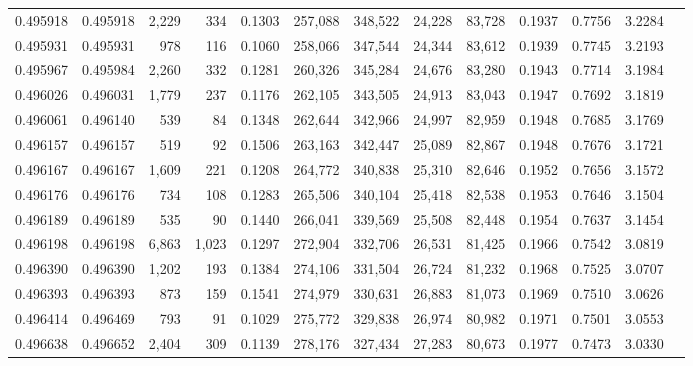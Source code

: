 \begin{tabular}{rrrrrrrrrrrrr}
0.495918 & 0.495918 & 2,229 &   334 &                                     0.1303 & 257,088 & 348,522 &  24,228 &  83,728 & 0.1937 & 0.7756 & 3.2284 \\
0.495931 & 0.495931 &   978 &   116 &                                     0.1060 & 258,066 & 347,544 &  24,344 &  83,612 & 0.1939 & 0.7745 & 3.2193 \\
0.495967 & 0.495984 & 2,260 &   332 &                                     0.1281 & 260,326 & 345,284 &  24,676 &  83,280 & 0.1943 & 0.7714 & 3.1984 \\
0.496026 & 0.496031 & 1,779 &   237 &                                     0.1176 & 262,105 & 343,505 &  24,913 &  83,043 & 0.1947 & 0.7692 & 3.1819 \\
0.496061 & 0.496140 &   539 &    84 &                                     0.1348 & 262,644 & 342,966 &  24,997 &  82,959 & 0.1948 & 0.7685 & 3.1769 \\
0.496157 & 0.496157 &   519 &    92 &                                     0.1506 & 263,163 & 342,447 &  25,089 &  82,867 & 0.1948 & 0.7676 & 3.1721 \\
0.496167 & 0.496167 & 1,609 &   221 &                                     0.1208 & 264,772 & 340,838 &  25,310 &  82,646 & 0.1952 & 0.7656 & 3.1572 \\
0.496176 & 0.496176 &   734 &   108 &                                     0.1283 & 265,506 & 340,104 &  25,418 &  82,538 & 0.1953 & 0.7646 & 3.1504 \\
0.496189 & 0.496189 &   535 &    90 &                                     0.1440 & 266,041 & 339,569 &  25,508 &  82,448 & 0.1954 & 0.7637 & 3.1454 \\
0.496198 & 0.496198 & 6,863 & 1,023 &                                     0.1297 & 272,904 & 332,706 &  26,531 &  81,425 & 0.1966 & 0.7542 & 3.0819 \\
0.496390 & 0.496390 & 1,202 &   193 &                                     0.1384 & 274,106 & 331,504 &  26,724 &  81,232 & 0.1968 & 0.7525 & 3.0707 \\
0.496393 & 0.496393 &   873 &   159 &                                     0.1541 & 274,979 & 330,631 &  26,883 &  81,073 & 0.1969 & 0.7510 & 3.0626 \\
0.496414 & 0.496469 &   793 &    91 &                                     0.1029 & 275,772 & 329,838 &  26,974 &  80,982 & 0.1971 & 0.7501 & 3.0553 \\
0.496638 & 0.496652 & 2,404 &   309 &                                     0.1139 & 278,176 & 327,434 &  27,283 &  80,673 & 0.1977 & 0.7473 & 3.0330 \\

\end{tabular}

